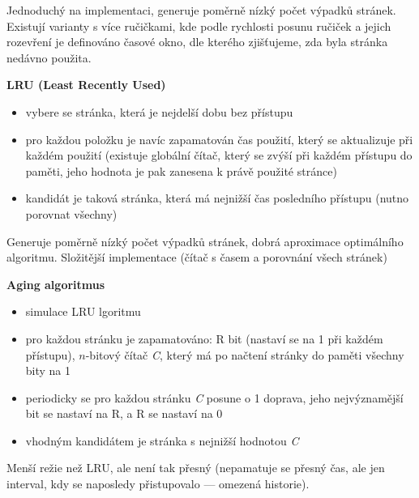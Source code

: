 Jednoduchý na implementaci, generuje poměrně nízký počet výpadků stránek. Existují varianty s více ručičkami, kde podle rychlosti posunu ručiček a jejich rozevření je definováno časové okno, dle kterého zjišťujeme, zda byla stránka nedávno použita.

\textbf{LRU (Least Recently Used)}
\begin{itemize}
	\item vybere se stránka, která je nejdelší dobu bez přístupu
	\item pro každou položku je navíc zapamatován čas použití, který se aktualizuje při každém použití (existuje globální čítač, který se zvýší při každém přístupu do paměti, jeho hodnota je pak zanesena k právě použité stránce)
	\item kandidát je taková stránka, která má nejnižší čas posledního přístupu (nutno porovnat všechny)
\end{itemize}

Generuje poměrně nízký počet výpadků stránek, dobrá aproximace optimálního algoritmu. Složitější implementace (čítač s časem a porovnání všech stránek)

\textbf{Aging algoritmus}
\begin{itemize}
	\item simulace LRU lgoritmu
	\item pro každou stránku je zapamatováno: R bit (nastaví se na 1 při každém přístupu), $n$-bitový čítač \textit{C}, který má po načtení stránky do paměti všechny bity na 1
	\item periodicky se pro každou stránku \textit{C} posune o 1 doprava, jeho nejvýznamější bit se nastaví na R, a R se nastaví na 0
	\item vhodným kandidátem je stránka s nejnižší hodnotou \textit{C}
\end{itemize}

Menší režie než LRU, ale není tak přesný (nepamatuje se přesný čas, ale jen interval, kdy se naposledy přistupovalo --- omezená historie).